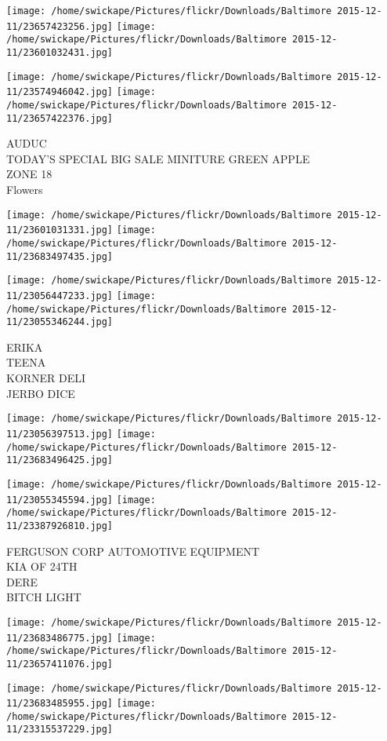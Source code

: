 \documentclass[10pt,letterpaper]{article}
\begin{document}
\texttt{[image: /home/swickape/Pictures/flickr/Downloads/Baltimore 2015-12-11/23657423256.jpg]}
\texttt{[image: /home/swickape/Pictures/flickr/Downloads/Baltimore 2015-12-11/23601032431.jpg]}

\texttt{[image: /home/swickape/Pictures/flickr/Downloads/Baltimore 2015-12-11/23574946042.jpg]}
\texttt{[image: /home/swickape/Pictures/flickr/Downloads/Baltimore 2015-12-11/23657422376.jpg]}

AUDUC\\
TODAY'S SPECIAL BIG SALE MINITURE GREEN APPLE\\
ZONE 18\\
Flowers
\pagebreak

\texttt{[image: /home/swickape/Pictures/flickr/Downloads/Baltimore 2015-12-11/23601031331.jpg]}
\texttt{[image: /home/swickape/Pictures/flickr/Downloads/Baltimore 2015-12-11/23683497435.jpg]}

\texttt{[image: /home/swickape/Pictures/flickr/Downloads/Baltimore 2015-12-11/23056447233.jpg]}
\texttt{[image: /home/swickape/Pictures/flickr/Downloads/Baltimore 2015-12-11/23055346244.jpg]}

ERIKA\\
TEENA\\
KORNER DELI\\
JERBO DICE
\pagebreak

\texttt{[image: /home/swickape/Pictures/flickr/Downloads/Baltimore 2015-12-11/23056397513.jpg]}
\texttt{[image: /home/swickape/Pictures/flickr/Downloads/Baltimore 2015-12-11/23683496425.jpg]}

\texttt{[image: /home/swickape/Pictures/flickr/Downloads/Baltimore 2015-12-11/23055345594.jpg]}
\texttt{[image: /home/swickape/Pictures/flickr/Downloads/Baltimore 2015-12-11/23387926810.jpg]}

FERGUSON CORP AUTOMOTIVE EQUIPMENT\\
KIA OF 24TH\\
DERE\\
BITCH LIGHT
\pagebreak

\texttt{[image: /home/swickape/Pictures/flickr/Downloads/Baltimore 2015-12-11/23683486775.jpg]}
\texttt{[image: /home/swickape/Pictures/flickr/Downloads/Baltimore 2015-12-11/23657411076.jpg]}

\texttt{[image: /home/swickape/Pictures/flickr/Downloads/Baltimore 2015-12-11/23683485955.jpg]}
\texttt{[image: /home/swickape/Pictures/flickr/Downloads/Baltimore 2015-12-11/23315537229.jpg]}
\end{document}
